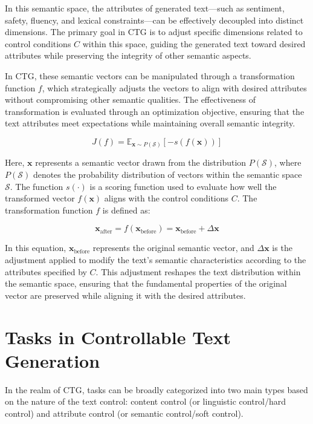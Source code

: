 \documentclass[acmsmall, screen]{acmart}
\begin{document}
In this semantic space, the attributes of generated text—such as sentiment, safety, fluency, and lexical constraints—can be effectively decoupled into distinct dimensions. The primary goal in CTG is to adjust specific dimensions related to control conditions \(C\) within this space, guiding the generated text toward desired attributes while preserving the integrity of other semantic aspects.

In CTG, these semantic vectors can be manipulated through a transformation function \(f\), which strategically adjusts the vectors to align with desired attributes without compromising other semantic qualities. The effectiveness of transformation is evaluated through an optimization objective, ensuring that the text attributes meet expectations while maintaining overall semantic integrity.

\begin{equation}
J(f) = \mathbb{E}_{\mathbf{x} \sim P(\mathcal{S})} [-s(f(\mathbf{x}))]
\end{equation}

Here, \(\mathbf{x}\) represents a semantic vector drawn from the distribution \(P(\mathcal{S})\), where \(P(\mathcal{S})\) denotes the probability distribution of vectors within the semantic space \(\mathcal{S}\). The function \(s(\cdot)\) is a scoring function used to evaluate how well the transformed vector \(f(\mathbf{x})\) aligns with the control conditions \(C\). The transformation function \(f\) is defined as:

\begin{equation}
\mathbf{x}_{\text{after}} = f(\mathbf{x}_{\text{before}}) = \mathbf{x}_{\text{before}} + \Delta\mathbf{x}
\end{equation}

In this equation, \(\mathbf{x}_{\text{before}}\) represents the original semantic vector, and \(\Delta\mathbf{x}\) is the adjustment applied to modify the text's semantic characteristics according to the attributes specified by \(C\). This adjustment reshapes the text distribution within the semantic space, ensuring that the fundamental properties of the original vector are preserved while aligning it with the desired attributes.

\section{Tasks in Controllable Text Generation}
\label{sec:ctg_tasks}

In the realm of CTG, tasks can be broadly categorized into two main types based on the nature of the text control: content control (or linguistic control/hard control) and attribute control (or semantic control/soft control).
\end{document}
